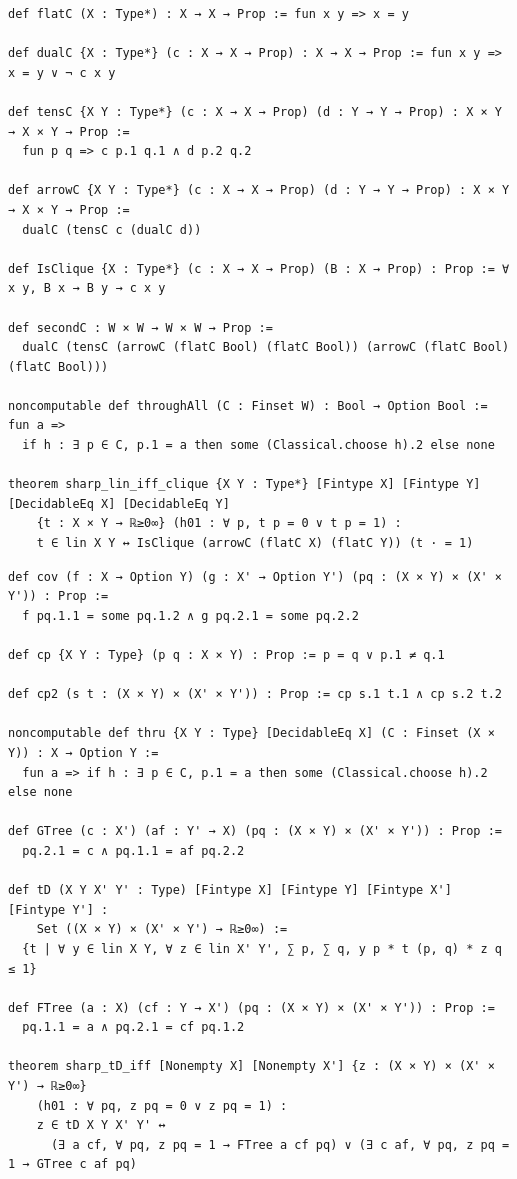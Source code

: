 \label{lean:sharp-lin-iff-clique}
\begin{lstlisting}
def flatC (X : Type*) : X → X → Prop := fun x y => x = y

def dualC {X : Type*} (c : X → X → Prop) : X → X → Prop := fun x y => x = y ∨ ¬ c x y

def tensC {X Y : Type*} (c : X → X → Prop) (d : Y → Y → Prop) : X × Y → X × Y → Prop :=
  fun p q => c p.1 q.1 ∧ d p.2 q.2

def arrowC {X Y : Type*} (c : X → X → Prop) (d : Y → Y → Prop) : X × Y → X × Y → Prop :=
  dualC (tensC c (dualC d))

def IsClique {X : Type*} (c : X → X → Prop) (B : X → Prop) : Prop := ∀ x y, B x → B y → c x y

def secondC : W × W → W × W → Prop :=
  dualC (tensC (arrowC (flatC Bool) (flatC Bool)) (arrowC (flatC Bool) (flatC Bool)))

noncomputable def throughAll (C : Finset W) : Bool → Option Bool := fun a =>
  if h : ∃ p ∈ C, p.1 = a then some (Classical.choose h).2 else none

theorem sharp_lin_iff_clique {X Y : Type*} [Fintype X] [Fintype Y] [DecidableEq X] [DecidableEq Y]
    {t : X × Y → ℝ≥0∞} (h01 : ∀ p, t p = 0 ∨ t p = 1) :
    t ∈ lin X Y ↔ IsClique (arrowC (flatC X) (flatC Y)) (t · = 1)
\end{lstlisting}

\label{lean:sharp-td-iff}
\begin{lstlisting}
def cov (f : X → Option Y) (g : X' → Option Y') (pq : (X × Y) × (X' × Y')) : Prop :=
  f pq.1.1 = some pq.1.2 ∧ g pq.2.1 = some pq.2.2

def cp {X Y : Type} (p q : X × Y) : Prop := p = q ∨ p.1 ≠ q.1

def cp2 (s t : (X × Y) × (X' × Y')) : Prop := cp s.1 t.1 ∧ cp s.2 t.2

noncomputable def thru {X Y : Type} [DecidableEq X] (C : Finset (X × Y)) : X → Option Y :=
  fun a => if h : ∃ p ∈ C, p.1 = a then some (Classical.choose h).2 else none

def GTree (c : X') (af : Y' → X) (pq : (X × Y) × (X' × Y')) : Prop :=
  pq.2.1 = c ∧ pq.1.1 = af pq.2.2

def tD (X Y X' Y' : Type) [Fintype X] [Fintype Y] [Fintype X'] [Fintype Y'] :
    Set ((X × Y) × (X' × Y') → ℝ≥0∞) :=
  {t | ∀ y ∈ lin X Y, ∀ z ∈ lin X' Y', ∑ p, ∑ q, y p * t (p, q) * z q ≤ 1}

def FTree (a : X) (cf : Y → X') (pq : (X × Y) × (X' × Y')) : Prop :=
  pq.1.1 = a ∧ pq.2.1 = cf pq.1.2

theorem sharp_tD_iff [Nonempty X] [Nonempty X'] {z : (X × Y) × (X' × Y') → ℝ≥0∞}
    (h01 : ∀ pq, z pq = 0 ∨ z pq = 1) :
    z ∈ tD X Y X' Y' ↔
      (∃ a cf, ∀ pq, z pq = 1 → FTree a cf pq) ∨ (∃ c af, ∀ pq, z pq = 1 → GTree c af pq)
\end{lstlisting}

